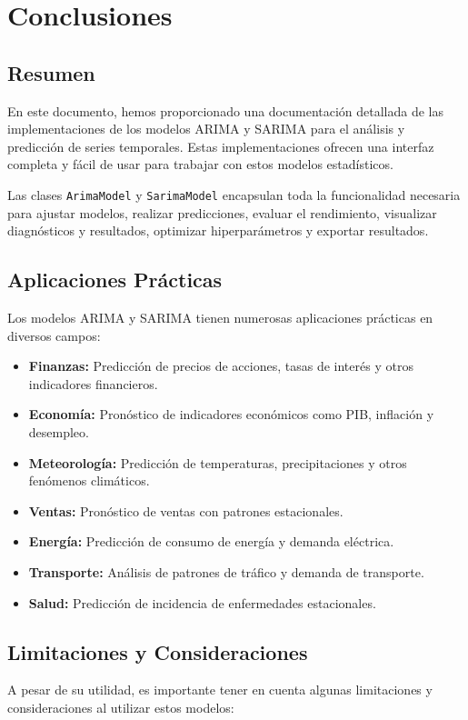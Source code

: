 \documentclass[12pt,letterpaper]{report}
\begin{document}
\chapter{Conclusiones}

\section{Resumen}
En este documento, hemos proporcionado una documentación detallada de las implementaciones de los modelos ARIMA y SARIMA para el análisis y predicción de series temporales. Estas implementaciones ofrecen una interfaz completa y fácil de usar para trabajar con estos modelos estadísticos.

Las clases \texttt{ArimaModel} y \texttt{SarimaModel} encapsulan toda la funcionalidad necesaria para ajustar modelos, realizar predicciones, evaluar el rendimiento, visualizar diagnósticos y resultados, optimizar hiperparámetros y exportar resultados.

\section{Aplicaciones Prácticas}
Los modelos ARIMA y SARIMA tienen numerosas aplicaciones prácticas en diversos campos:

\begin{itemize}
    \item \textbf{Finanzas:} Predicción de precios de acciones, tasas de interés y otros indicadores financieros.
    \item \textbf{Economía:} Pronóstico de indicadores económicos como PIB, inflación y desempleo.
    \item \textbf{Meteorología:} Predicción de temperaturas, precipitaciones y otros fenómenos climáticos.
    \item \textbf{Ventas:} Pronóstico de ventas con patrones estacionales.
    \item \textbf{Energía:} Predicción de consumo de energía y demanda eléctrica.
    \item \textbf{Transporte:} Análisis de patrones de tráfico y demanda de transporte.
    \item \textbf{Salud:} Predicción de incidencia de enfermedades estacionales.
\end{itemize}

\section{Limitaciones y Consideraciones}
A pesar de su utilidad, es importante tener en cuenta algunas limitaciones y consideraciones al utilizar estos modelos:
\end{document}
